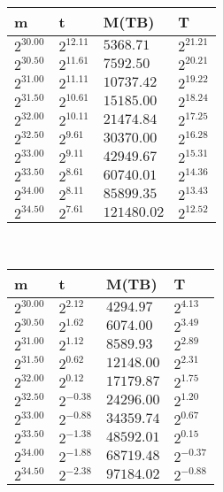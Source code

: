 \begin{tabular}{llll}
m & t & M(TB) & T \\ \hline
$2^{30.00}$ & $2^{12.11}$ & $5368.71$ & $2^{21.21}$ \\
$2^{30.50}$ & $2^{11.61}$ & $7592.50$ & $2^{20.21}$ \\
$2^{31.00}$ & $2^{11.11}$ & $10737.42$ & $2^{19.22}$ \\
$2^{31.50}$ & $2^{10.61}$ & $15185.00$ & $2^{18.24}$ \\
$2^{32.00}$ & $2^{10.11}$ & $21474.84$ & $2^{17.25}$ \\
$2^{32.50}$ & $2^{9.61}$ & $30370.00$ & $2^{16.28}$ \\
$2^{33.00}$ & $2^{9.11}$ & $42949.67$ & $2^{15.31}$ \\
$2^{33.50}$ & $2^{8.61}$ & $60740.01$ & $2^{14.36}$ \\
$2^{34.00}$ & $2^{8.11}$ & $85899.35$ & $2^{13.43}$ \\
$2^{34.50}$ & $2^{7.61}$ & $121480.02$ & $2^{12.52}$ \\
\end{tabular}
 \ 
\begin{tabular}{llll}
m & t & M(TB) & T \\ \hline
$2^{30.00}$ & $2^{2.12}$ & $4294.97$ & $2^{4.13}$ \\
$2^{30.50}$ & $2^{1.62}$ & $6074.00$ & $2^{3.49}$ \\
$2^{31.00}$ & $2^{1.12}$ & $8589.93$ & $2^{2.89}$ \\
$2^{31.50}$ & $2^{0.62}$ & $12148.00$ & $2^{2.31}$ \\
$2^{32.00}$ & $2^{0.12}$ & $17179.87$ & $2^{1.75}$ \\
$2^{32.50}$ & $2^{-0.38}$ & $24296.00$ & $2^{1.20}$ \\
$2^{33.00}$ & $2^{-0.88}$ & $34359.74$ & $2^{0.67}$ \\
$2^{33.50}$ & $2^{-1.38}$ & $48592.01$ & $2^{0.15}$ \\
$2^{34.00}$ & $2^{-1.88}$ & $68719.48$ & $2^{-0.37}$ \\
$2^{34.50}$ & $2^{-2.38}$ & $97184.02$ & $2^{-0.88}$ \\
\end{tabular}
 \ 
